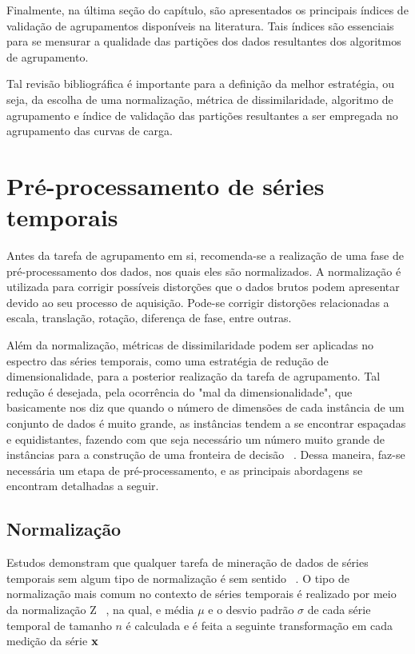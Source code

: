Finalmente, na última seção do capítulo, são apresentados os principais índices de validação de agrupamentos disponíveis na literatura. Tais índices são essenciais para se mensurar a qualidade das partições dos dados resultantes dos algoritmos de agrupamento.

Tal revisão bibliográfica é importante para a definição da melhor estratégia, ou seja, da escolha de uma normalização, métrica de dissimilaridade, algoritmo de agrupamento e índice de validação das partições resultantes a ser empregada no agrupamento das curvas de carga.

\section{Pré-processamento de séries temporais}

Antes da tarefa de agrupamento em si, recomenda-se a realização de uma fase de pré-processamento dos dados, nos quais eles são normalizados. A normalização é utilizada para corrigir possíveis distorções que o dados brutos podem apresentar devido ao seu processo de aquisição. Pode-se corrigir distorções relacionadas a escala, translação, rotação, diferença de fase, entre outras.

Além da normalização, métricas de dissimilaridade podem ser aplicadas no espectro das séries temporais, como uma estratégia de redução de dimensionalidade, para a posterior realização da tarefa de agrupamento. Tal redução é desejada, pela ocorrência do "mal da dimensionalidade", que basicamente nos diz que quando o número de dimensões de cada instância de um conjunto de dados é muito grande, as instâncias tendem a se encontrar espaçadas e equidistantes, fazendo com que seja necessário um número muito grande de instâncias para a construção de uma fronteira de decisão ~\parencite{DudaHart}. Dessa maneira, faz-se necessária um etapa de pré-processamento, e as principais abordagens se encontram detalhadas a seguir.

\subsection{Normalização} \label{sec:norm_Z}

Estudos demonstram que qualquer tarefa de mineração de dados de séries temporais sem algum tipo de normalização é sem sentido ~\parencite{Keogh_need_norm}. O tipo de normalização mais comum no contexto de séries temporais é realizado por meio da normalização Z ~\parencite{trillions}, na qual, e média $\mu$ e o desvio padrão $\sigma$ de cada série temporal de tamanho $n$ é calculada e é feita a seguinte transformação em cada medição da série $\bf{x}$

